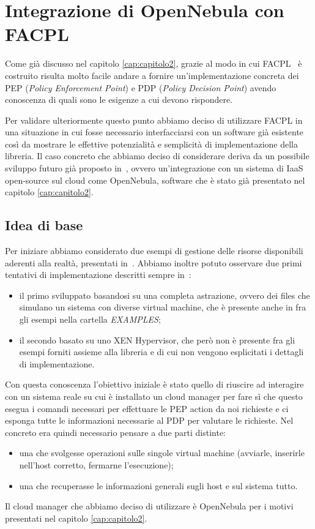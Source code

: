 
\chapter{Integrazione di OpenNebula con FACPL}
\label{cap:capitolo3}
Come già discusso nel capitolo \ref{cap:capitolo2}, grazie al modo in cui FACPL~\cite{facpl} è costruito risulta molto facile andare a fornire un'implementazione concreta dei PEP (\emph{Policy Enforcement Point}) e PDP (\emph{Policy Decision Point}) avendo conoscenza  di quali sono le esigenze a cui devono rispondere.\par
Per validare ulteriormente questo punto abbiamo deciso di utilizzare FACPL in una situazione in cui fosse necessario interfacciarsi con un software già esistente così da mostrare le effettive potenzialità e semplicità di implementazione della libreria.
Il caso concreto che abbiamo deciso di considerare deriva da un possibile sviluppo futuro già proposto in~\cite{10.1007/978-3-319-08260-8_6}, ovvero un'integrazione con un sistema di IaaS open-source sul cloud come OpenNebula\cite{opennebula}, software che è stato già presentato nel capitolo \ref{cap:capitolo2}.

\section{Idea di base}
Per iniziare abbiamo considerato due esempi di gestione delle risorse disponibili aderenti alla realtà, presentati in~\cite{10.1007/978-3-319-08260-8_6}.
Abbiamo inoltre potuto osservare due primi tentativi di implementazione descritti sempre in~\cite{10.1007/978-3-319-08260-8_6}:
\begin{itemize}
    \item il primo sviluppato basandosi su una completa astrazione, ovvero dei files che simulano un sistema con diverse virtual machine, che è presente anche in \cite{facpl-github} fra gli esempi nella cartella \emph{EXAMPLES};
    \item il secondo basato su uno XEN Hypervisor, che però non è presente fra gli esempi forniti assieme alla libreria e di cui non vengono esplicitati i dettagli di implementazione.
\end{itemize}
Con questa conoscenza l'obiettivo iniziale è stato quello di riuscire ad interagire con un sistema reale su cui è installato un cloud manager per fare sì che questo esegua i comandi necessari per effettuare le PEP action da noi richieste e ci esponga tutte le informazioni necessarie al PDP per valutare le richieste.
Nel concreto era quindi necessario pensare a due parti distinte:
\begin{itemize}
    \item una che svolgesse operazioni sulle singole virtual machine (avviarle, inserirle nell'host corretto, fermarne l'esecuzione);
    \item una che recuperasse le informazioni generali sugli host e sul sistema tutto.
\end{itemize}
Il cloud manager che abbiamo deciso di utilizzare è OpenNebula per i motivi presentati nel capitolo \ref{cap:capitolo2}.

